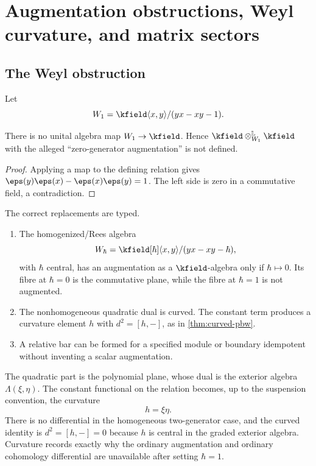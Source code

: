 \chapter{Augmentation obstructions, Weyl curvature, and matrix sectors}\label{chap:augmentation}

\section{The Weyl obstruction}
Let
\[
 W_1=\kfield\langle x,y\rangle/(yx-xy-1).
\]

\begin{theorem}\label{thm:weyl-noaug}
There is no unital algebra map \(W_1\to\kfield\).  Hence \(\kfield\otimes_{W_1}^{\mathbb L}\kfield\) with the alleged ``zero-generator augmentation'' is not defined.
\end{theorem}
\begin{proof}
Applying a map to the defining relation gives \(\eps(y)\eps(x)-\eps(x)\eps(y)=1\).  The left side is zero in a commutative field, a contradiction.
\end{proof}

The correct replacements are typed.
\begin{enumerate}
\item The homogenized/Rees algebra
\[
 W_{\hbar}=\kfield[\hbar]\langle x,y\rangle/(yx-xy-\hbar),
\]
with \(\hbar\) central, has an augmentation as a \(\kfield\)-algebra only if \(\hbar\mapsto0\).  Its fibre at \(\hbar=0\) is the commutative plane, while the fibre at \(\hbar=1\) is not augmented.
\item The nonhomogeneous quadratic dual is curved.  The constant term produces a curvature element \(h\) with \(d^2=[h,-]\), as in \cref{thm:curved-pbw}.
\item A relative bar can be formed for a specified module or boundary idempotent without inventing a scalar augmentation.
\end{enumerate}

\begin{calcbox}[title={Curved dual of the first Weyl algebra}]
The quadratic part is the polynomial plane, whose dual is the exterior algebra \(\Lambda(\xi,\eta)\).  The constant functional on the relation becomes, up to the suspension convention, the curvature
\[
 h=\xi\eta.
\]
There is no differential in the homogeneous two-generator case, and the curved identity is \(d^2=[h,-]=0\) because \(h\) is central in the graded exterior algebra.  Curvature records exactly why the ordinary augmentation and ordinary cohomology differential are unavailable after setting \(\hbar=1\).
\end{calcbox}

